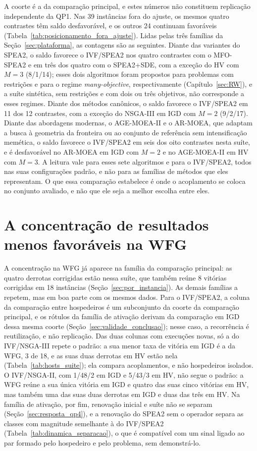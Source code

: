 A coorte é a da comparação principal, e estes números não constituem replicação independente da QP1. Nas 39 instâncias fora do ajuste, os mesmos quatro contrastes têm saldo desfavorável, e os outros 24 continuam favoráveis (Tabela~\ref{tab:posicionamento_fora_ajuste}). Lidas pelas três famílias da Seção~\ref{sec:plataforma}, as contagens são as seguintes. Diante das variantes do SPEA2, o saldo favorece o IVF/SPEA2 nos quatro contrastes com o MFO-SPEA2 e em três dos quatro com o SPEA2+SDE, com a exceção do HV com $M = 3$ (8/1/14); esses dois algoritmos foram propostos para problemas com restrições e para o regime \textit{many-objective}, respectivamente (Capítulo~\ref{sec:RW}), e a suíte sintética, sem restrições e com dois ou três objetivos, não corresponde a esses regimes. Diante dos métodos canônicos, o saldo favorece o IVF/SPEA2 em 11 dos 12 contrastes, com a exceção do NSGA-III em IGD com $M = 2$ (9/2/17). Diante das abordagens modernas, o AGE-MOEA-II e o AR-MOEA, que adaptam a busca à geometria da fronteira ou ao conjunto de referência sem intensificação memética, o saldo favorece o IVF/SPEA2 em seis dos oito contrastes nesta suíte, e é desfavorável no AR-MOEA em IGD com $M = 2$ e no AGE-MOEA-II em HV com $M = 3$. A leitura vale para esses sete algoritmos e para o IVF/SPEA2, todos nas suas configurações padrão, e não para as famílias de métodos que eles representam. O que essa comparação estabelece é onde o acoplamento se coloca no conjunto avaliado, e não que ele seja a melhor escolha entre eles.

\section{A concentração de resultados menos favoráveis na WFG}
\label{sec:padrao_familias}

A concentração na WFG já aparece na família da comparação principal: as quatro derrotas corrigidas estão nessa suíte, que também reúne 8 vitórias corrigidas em 18 instâncias (Seção~\ref{sec:por_instancia}). As demais famílias a repetem, mas em boa parte com os mesmos dados. Para o IVF/SPEA2, a coluna da comparação entre hospedeiros é um subconjunto da coorte da comparação principal, e os rótulos da família de ativação derivam da comparação em IGD dessa mesma coorte (Seção~\ref{sec:validade_conclusao}); nesse caso, a recorrência é reutilização, e não replicação. Das duas colunas com execuções novas, só a do IVF/NSGA-III repete o padrão: a sua menor taxa de vitória em IGD é a da WFG, 3 de 18, e as suas duas derrotas em HV estão nela (Tabela~\ref{tab:hosts_suite}); ela compara acoplamentos, e não hospedeiros isolados. O IVF/NSGA-II, com 1/48/2 em IGD e 5/43/3 em HV, não segue o padrão: a WFG reúne a sua única vitória em IGD e quatro das suas cinco vitórias em HV, mas também uma das suas duas derrotas em IGD e duas das três em HV. Na família de ativação, por fim, renovação inicial e suíte não se separam (Seção~\ref{sec:resposta_qp4}), e a renovação do SPEA2 sem o operador separa as classes com magnitude semelhante à do IVF/SPEA2 (Tabela~\ref{tab:dinamica_separacao}), o que é compatível com um sinal ligado ao par formado pelo hospedeiro e pelo problema, sem demonstrá-lo.

